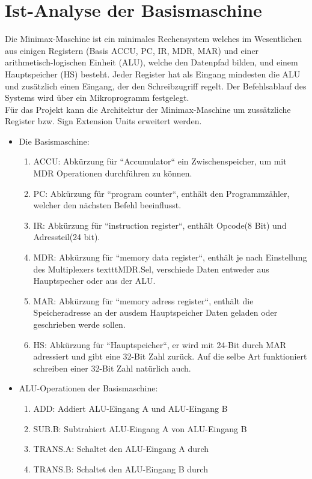 \documentclass[12pt,titlepage,german,a4]{article}
\begin{document}
    \newpage

    \section{Ist-Analyse der Basismaschine}
    Die Minimax-Maschine ist ein minimales Rechensystem welches im Wesentlichen aus einigen Registern (Basis ACCU, PC, IR, MDR, MAR) und einer arithmetisch-logischen Einheit (ALU), welche den Datenpfad bilden, und einem Hauptspeicher (HS) besteht. Jeder Register hat als Eingang mindesten die ALU und zus{\"a}tzlich einen Eingang, der den Schreibzugriff regelt. Der Befehlsablauf des Systems wird {\"u}ber ein Mikroprogramm festgelegt.\\
    F{\"u}r das Projekt kann die Architektur der Minimax-Maschine um zuss{\"a}tzliche Register bzw. Sign Extension Units erweitert werden.
    \begin{itemize}
        \item Die Basismaschine:
        \begin{enumerate}
            \item ACCU: Abk{\"u}rzung f{\"u}r “Accumulator“ ein Zwischenspeicher, um mit MDR Operationen durchf{\"u}hren zu k{\"o}nnen.
            \item PC: Abk{\"u}rzung f{\"u}r “program counter“, enth{\"a}lt den Programmz{\"a}hler, welcher den n{\"a}chsten Befehl beeinflusst.
            \item IR: Abk{\"u}rzung f{\"u}r “instruction register“, enth{\"a}lt Opcode(8 Bit) und Adressteil(24 bit).
            \item MDR: Abk{\"u}rzung f{\"u}r “memory data register“, enth{\"a}lt je nach Einstellung des Multiplexers textttMDR.Sel, verschiede Daten entweder aus Hauptspecher oder aus der ALU.
            \item MAR: Abk{\"u}rzung f{\"u}r “memory adress register“, enth{\"a}lt die Speicheradresse an der ausdem Hauptspeicher Daten geladen oder geschrieben werde sollen.
            \item HS: Abk{\"u}rzung f{\"u}r “Hauptspeicher“, er wird mit 24-Bit durch MAR adressiert und gibt eine 32-Bit Zahl zur{\"u}ck. Auf die selbe Art funktioniert schreiben einer 32-Bit Zahl nat{\"u}rlich auch.
        \end{enumerate}
        \item ALU-Operationen der Basismaschine:
        \begin{enumerate}
            \item ADD: Addiert ALU-Eingang A und ALU-Eingang B
            \item SUB.B: Subtrahiert ALU-Eingang A von ALU-Eingang B
            \item TRANS.A: Schaltet den ALU-Eingang A durch
            \item TRANS.B: Schaltet den ALU-Eingang B durch
        \end{enumerate}
    \end{itemize}
\end{document}
